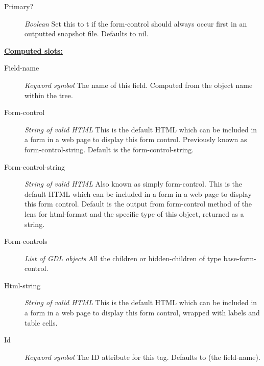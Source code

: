 \documentclass [11pt]{book}
\begin{document}
\begin{itemize}
\begin{description}
\item [Primary?]
\emph{Boolean} Set this to t if the form-control should always occur first in an outputted snapshot file.
Defaults to nil.


\end{description}






\textbf{
\underline{Computed slots:}}

\begin{description}

\item [Field-name]
\emph{Keyword symbol} The name of this field. Computed from the object name within the tree.


\item [Form-control]
\emph{String of valid HTML} This is the default HTML which can be included in a form in a web page to display this form control.
Previously known as form-control-string. Default is the form-control-string.


\item [Form-control-string]
\emph{String of valid HTML} Also known as simply form-control.
This is the default HTML which can be included in a form in a web page to display this form control.
Default is the output from form-control method of the lens for html-format and the
specific type of this object, returned as a string.


\item [Form-controls]
\emph{List of GDL objects} All the children or hidden-children
of type base-form-control.


\item [Html-string]
\emph{String of valid HTML} This is the default HTML which can be included in a form in a web page to display this form control, wrapped with labels and table cells.


\item [Id]
\emph{Keyword symbol} The ID attribute for this tag. Defaults to (the field-name).


\end{description}








\end{itemize}
\end{document}
